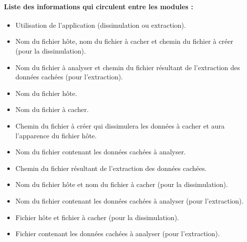 \documentclass[11pt]{article}
\begin{document}
\paragraph{Liste des informations qui circulent entre les modules :}

\begin{description}
\small
\item[1)] 
\begin{itemize}
\item Utilisation de l'application (dissimulation ou extraction).
\item Nom du fichier hôte, nom du fichier à cacher et chemin du fichier à créer
    (pour la dissimulation).
\item Nom du fichier à analyser et chemin du fichier résultant de l'extraction
    des données cachées (pour l'extraction).
\end{itemize}
\item[2)] 
\begin{itemize}
\item Nom du fichier hôte.
\item Nom du fichier à cacher.
\item Chemin du fichier à créer qui dissimulera les données à cacher et aura
    l'apparence du fichier hôte.
\end{itemize}
\item[3)] 
\begin{itemize}
\item Nom du fichier contenant les données cachées à analyser.
\item Chemin du fichier résultant de l'extraction des données cachées.
\end{itemize}
\item[4)] 
\begin{itemize}
\item Nom du fichier hôte et nom du fichier à cacher (pour la dissimulation).
\item Nom du fichier contenant les données cachées à analyser (pour
    l'extraction).
\end{itemize}
\item[5)]
\begin{itemize}
\item Fichier hôte et fichier à cacher (pour la dissimulation).
\item Fichier contenant les données cachées à analyser (pour l'extraction).
\end{itemize}
\item[6)]
\begin{itemize}

\end{itemize}
\end{description}
\end{document}
